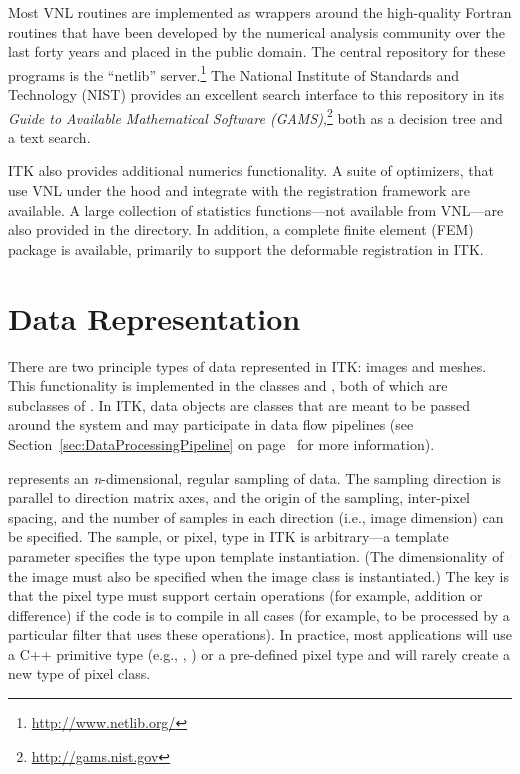 Most VNL routines are implemented as wrappers around the high-quality Fortran
routines that have been developed by the numerical analysis community over
the last forty years and placed in the public domain. The central repository
for these programs is the ``netlib'' server.\footnote{\url{http://www.netlib.org/}} The
National Institute of Standards and Technology (NIST) provides an excellent
search interface to this repository in its \emph{Guide to Available Mathematical
Software (GAMS)},\footnote{\url{http://gams.nist.gov}} both as a decision tree and a
text search.

ITK also provides additional numerics functionality. A suite of optimizers, that
use VNL under the hood and integrate with the registration framework
are available. A large collection of statistics functions---not available from
VNL---are also provided in the 
directory. In addition, a complete finite element (FEM) package is available,
primarily to support the deformable registration in ITK.


\section{Data Representation}
\label{sec:DataRepresentationAndAccess}


There are two principle types of data represented in ITK: images and
meshes. This functionality is implemented in the classes
 and , both of which are subclasses of
. In ITK, data objects are classes that are meant to
be passed around the system and may participate in data flow pipelines (see
Section~\ref{sec:DataProcessingPipeline} on
page~\pageref{sec:DataProcessingPipeline} for more information).



 represents an \emph{n}-dimensional, regular sampling of
data. The sampling direction is parallel to direction matrix axes, and
the origin of the sampling, inter-pixel spacing, and the number of samples in
each direction (i.e., image dimension) can be specified. The sample, or
pixel, type in ITK is arbitrary---a template parameter 
specifies the type upon template instantiation. (The dimensionality of the
image must also be specified when the image class is instantiated.) The key
is that the pixel type must support certain operations (for example, addition
or difference) if the code is to compile in all cases (for example, to be
processed by a particular filter that uses these operations). In practice,
most applications will use a C++ primitive type (e.g., , )
or a pre-defined pixel type and will rarely create a new type of pixel class.


